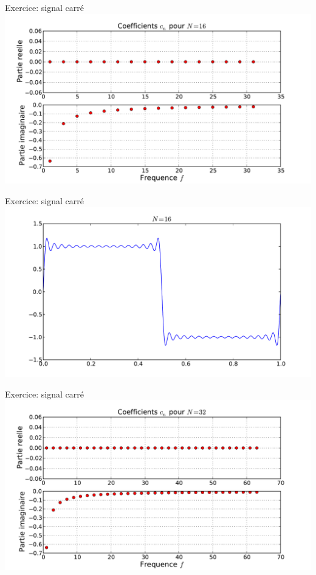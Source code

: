 \documentclass[8pt,a4paper]{beamer}
\begin{document}
\begin{frame}{Exercice: signal carré}
\includegraphics[width=1.\textwidth]{figures/serieF_carre_c_16.pdf} \\
\end{frame}

\begin{frame}{Exercice: signal carré}
\includegraphics[width=1.\textwidth]{figures/serieF_carre_16.pdf}\\
\end{frame}

\begin{frame}{Exercice: signal carré}
\includegraphics[width=1.\textwidth]{figures/serieF_carre_c_32.pdf} \\
\end{frame}
\end{document}
